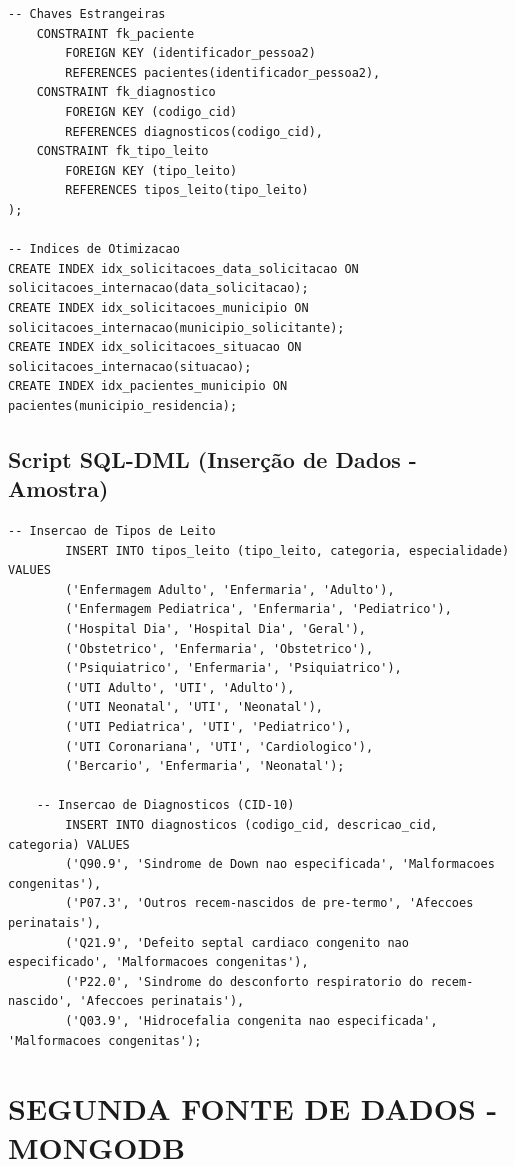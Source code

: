 \documentclass[12pt,a4paper]{article}
\begin{document}
\begin{lstlisting}[style=sqlstyle, caption=Criação do Schema e Tabelas]
    -- Chaves Estrangeiras
    CONSTRAINT fk_paciente 
        FOREIGN KEY (identificador_pessoa2) 
        REFERENCES pacientes(identificador_pessoa2),
    CONSTRAINT fk_diagnostico 
        FOREIGN KEY (codigo_cid) 
        REFERENCES diagnosticos(codigo_cid),
    CONSTRAINT fk_tipo_leito 
        FOREIGN KEY (tipo_leito) 
        REFERENCES tipos_leito(tipo_leito)
);

-- Indices de Otimizacao
CREATE INDEX idx_solicitacoes_data_solicitacao ON solicitacoes_internacao(data_solicitacao);
CREATE INDEX idx_solicitacoes_municipio ON solicitacoes_internacao(municipio_solicitante);
CREATE INDEX idx_solicitacoes_situacao ON solicitacoes_internacao(situacao);
CREATE INDEX idx_pacientes_municipio ON pacientes(municipio_residencia);
\end{lstlisting}

\subsection{Script SQL-DML (Inserção de Dados - Amostra)}

\begin{lstlisting}[style=sqlstyle, caption=Inserção de Dados de Exemplo]
    -- Insercao de Tipos de Leito
        INSERT INTO tipos_leito (tipo_leito, categoria, especialidade) VALUES
        ('Enfermagem Adulto', 'Enfermaria', 'Adulto'),
        ('Enfermagem Pediatrica', 'Enfermaria', 'Pediatrico'),
        ('Hospital Dia', 'Hospital Dia', 'Geral'),
        ('Obstetrico', 'Enfermaria', 'Obstetrico'),
        ('Psiquiatrico', 'Enfermaria', 'Psiquiatrico'),
        ('UTI Adulto', 'UTI', 'Adulto'),
        ('UTI Neonatal', 'UTI', 'Neonatal'),
        ('UTI Pediatrica', 'UTI', 'Pediatrico'),
        ('UTI Coronariana', 'UTI', 'Cardiologico'),
        ('Bercario', 'Enfermaria', 'Neonatal');

    -- Insercao de Diagnosticos (CID-10)
        INSERT INTO diagnosticos (codigo_cid, descricao_cid, categoria) VALUES
        ('Q90.9', 'Sindrome de Down nao especificada', 'Malformacoes congenitas'),
        ('P07.3', 'Outros recem-nascidos de pre-termo', 'Afeccoes perinatais'),
        ('Q21.9', 'Defeito septal cardiaco congenito nao especificado', 'Malformacoes congenitas'),
        ('P22.0', 'Sindrome do desconforto respiratorio do recem-nascido', 'Afeccoes perinatais'),
        ('Q03.9', 'Hidrocefalia congenita nao especificada', 'Malformacoes congenitas');
\end{lstlisting}

\section{SEGUNDA FONTE DE DADOS - MONGODB}
\end{document}

